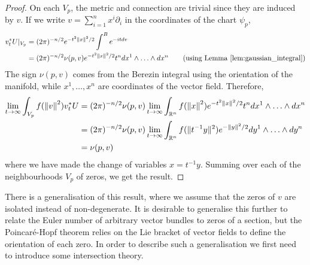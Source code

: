 \begin{proof}
	On each $V_p$, the metric and connection are trivial since they are induced 
	by $v$. If we write $v= \sum_{i=1}^{n} x^i \partial_i$ in the coordinates of
	the chart $\psi_p$,
	\begin{align*}
		v_t^*U |_{V_p} 
		&= (2\pi)^{-n/2} e^{-t^2\norm{x}^2 /2} \int^B e^{-itdv} \\
		&= (2\pi)^{-n/2} \nu(p,v) e^{-t^2\norm{x}^2 /2} t^n dx^1 \wedge
		\ldots\wedge dx^n \tag{using Lemma \ref{lem:gaussian_integral}}
	\end{align*}
	The sign $\nu(p,v)$ comes from the Berezin integral using the orientation of
	the manifold, while $x^1,\ldots,x^n$ are coordinates of the vector field. 
	Therefore, 
	\begin{align*}
		\lim_{t \to \infty} \int_{V_p} f(\norm{v}^2)v_t^*U 
		&= (2\pi)^{-n/2} \nu(p,v) 
		\lim_{t \to \infty} \int_{\mathbb{R}^n}
		f(\norm{x}^2) e^{-t^2\norm{x}^2 /2} t^n dx^1 \wedge \ldots\wedge dx^n\\
		&= (2\pi)^{-n/2} \nu(p,v) 
		\lim_{t \to \infty} \int_{\mathbb{R}^n} 
		f(\norm[*]{t^{-1}y}^2) e^{-\norm{y}^2 /2} dy^1 \wedge \ldots\wedge dy^n\\
		&= \nu(p,v) 
	\end{align*}
	where we have made the change of variables $x=t^{-1}y$. Summing over each of
	the neighbourhoods $V_p$ of zeros, we get the result.
\end{proof}

There is a generalisation of this result, where we assume that the zeros
of $v$ are isolated instead of non-degenerate.\cite[Theorem 1.58]{bgv} 
It is desirable to generalise this further to relate the Euler number of
arbitrary vector bundles to zeros of a section, but the Poincar\'e-Hopf theorem
relies on the Lie bracket of vector fields to define the orientation of each
zero. In order to describe such a generalisation we first need to introduce some
intersection theory.

